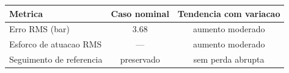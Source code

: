 \begin{tabular}{l c c}
    \toprule
    Metrica                  & Caso nominal & Tendencia com variacao \\
    \midrule
    Erro RMS (bar)           & 3.68         & aumento moderado       \\
    Esforco de atuacao RMS   & ---          & aumento moderado       \\
    Seguimento de referencia & preservado   & sem perda abrupta      \\
    \bottomrule
\end{tabular}
